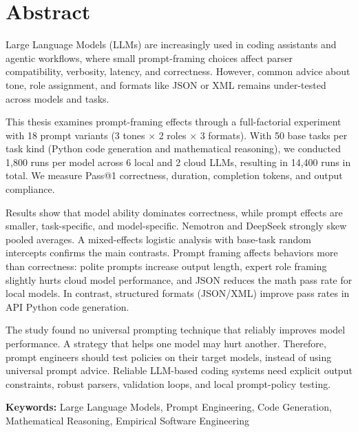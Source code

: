 \chapter*{Abstract}

Large Language Models (LLMs) are increasingly used in coding assistants and agentic workflows, where small prompt-framing choices affect parser compatibility, verbosity, latency, and correctness. However, common advice about tone, role assignment, and formats like JSON or XML remains under-tested across models and tasks.

This thesis examines prompt-framing effects through a full-factorial experiment with 18 prompt variants (3 tones $\times$ 2 roles $\times$ 3 formats). With 50 base tasks per task kind (Python code generation and mathematical reasoning), we conducted 1,800 runs per model across 6 local and 2 cloud LLMs, resulting in 14,400 runs in total. We measure Pass@1 correctness, duration, completion tokens, and output compliance.

Results show that model ability dominates correctness, while prompt effects are smaller, task-specific, and model-specific. Nemotron and DeepSeek strongly skew pooled averages. A mixed-effects logistic analysis with base-task random intercepts confirms the main contrasts. Prompt framing affects behaviors more than correctness: polite prompts increase output length, expert role framing slightly hurts cloud model performance, and JSON reduces the math pass rate for local models. In contrast, structured formats (JSON/XML) improve pass rates in API Python code generation.

The study found no universal prompting technique that reliably improves model performance. A strategy that helps one model may hurt another. Therefore, prompt engineers should test policies on their target models, instead of using universal prompt advice. Reliable LLM-based coding systems need explicit output constraints, robust parsers, validation loops, and local prompt-policy testing.

\vspace{1cm}
\noindent\textbf{Keywords:} Large Language Models, Prompt Engineering, Code Generation, Mathematical Reasoning, Empirical Software Engineering
